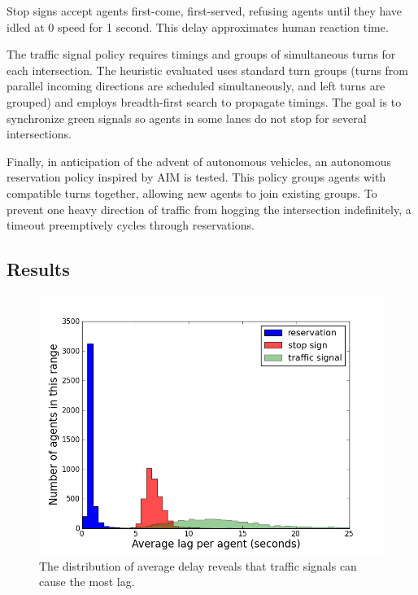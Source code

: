 \documentclass[letterpaper, 10 pt, conference]{ieeeconf}  %
\begin{document}
Stop signs accept agents first-come, first-served, refusing agents until they
have idled at 0 speed for 1 second. This delay approximates human reaction time.

The traffic signal policy requires timings and groups of simultaneous turns for
each intersection. The heuristic evaluated uses standard turn groups (turns from
parallel incoming directions are scheduled simultaneously, and left turns are
grouped) and employs breadth-first search to propagate timings. The goal is to
synchronize green signals so agents in some lanes do not stop for several
intersections.

Finally, in anticipation of the advent of autonomous vehicles, an autonomous
reservation policy inspired by AIM \cite{JAIR08-dresner} is tested. This policy
groups agents with compatible turns together, allowing new agents to join
existing groups. To prevent one heavy direction of traffic from hogging the
intersection indefinitely, a timeout preemptively cycles through reservations.

\subsection{Results}

\begin{figure}[h]
  \centering \includegraphics[width=\linewidth]{avg_lag_agent_atx.png}
  \caption{The distribution of average delay reveals that traffic signals can
           cause the most lag.}
  \label{fig:avg_lag}
  \vspace{-10pt}
\end{figure}
\end{document}
